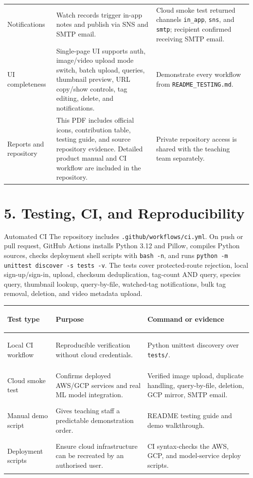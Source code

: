 \documentclass[12pt,a4paper]{article}
\begin{document}
\begin{tabularx}{\textwidth}{>{\bfseries\raggedright\arraybackslash}p{34mm}>{\raggedright\arraybackslash}p{61mm}X}
Notifications & Watch records trigger in-app notes and publish via SNS and SMTP email. & Cloud smoke test returned channels \texttt{in\_app}, \texttt{sns}, and \texttt{smtp}; recipient confirmed receiving SMTP email.\\
UI completeness & Single-page UI supports auth, image/video upload mode switch, batch upload, queries, thumbnail preview, URL copy/show controls, tag editing, delete, and notifications. & Demonstrate every workflow from \texttt{README\_TESTING.md}.\\
Reports and repository & This PDF includes official icons, contribution table, testing guide, and source repository evidence. Detailed product manual and CI workflow are included in the repository. & Private repository access is shared with the teaching team separately.\\
\bottomrule
\end{tabularx}
\normalsize

\section*{5. Testing, CI, and Reproducibility}
\begin{summarybox}{Automated CI}
The repository includes \texttt{.github/workflows/ci.yml}. On push or pull request, GitHub Actions installs Python 3.12 and Pillow, compiles Python sources, checks deployment shell scripts with \texttt{bash -n}, and runs \texttt{python -m unittest discover -s tests -v}. The tests cover protected-route rejection, local sign-up/sign-in, upload, checksum deduplication, tag-count AND query, species query, thumbnail lookup, query-by-file, watched-tag notifications, bulk tag removal, deletion, and video metadata upload.
\end{summarybox}

\small
\renewcommand{\arraystretch}{1.18}
\begin{tabularx}{\textwidth}{>{\bfseries\raggedright\arraybackslash}p{32mm}X>{\raggedright\arraybackslash}p{46mm}}
\toprule
\textbf{Test type} & \textbf{Purpose} & \textbf{Command or evidence}\\
\midrule
Local CI workflow & Reproducible verification without cloud credentials. & Python unittest discovery over \texttt{tests/}.\\
Cloud smoke test & Confirms deployed AWS/GCP services and real ML model integration. & Verified image upload, duplicate handling, query-by-file, deletion, GCP mirror, SMTP email.\\
Manual demo script & Gives teaching staff a predictable demonstration order. & README testing guide and demo walkthrough.\\
Deployment scripts & Ensure cloud infrastructure can be recreated by an authorised user. & CI syntax-checks the AWS, GCP, and model-service deploy scripts.\\
\bottomrule
\end{tabularx}
\normalsize
\end{document}
